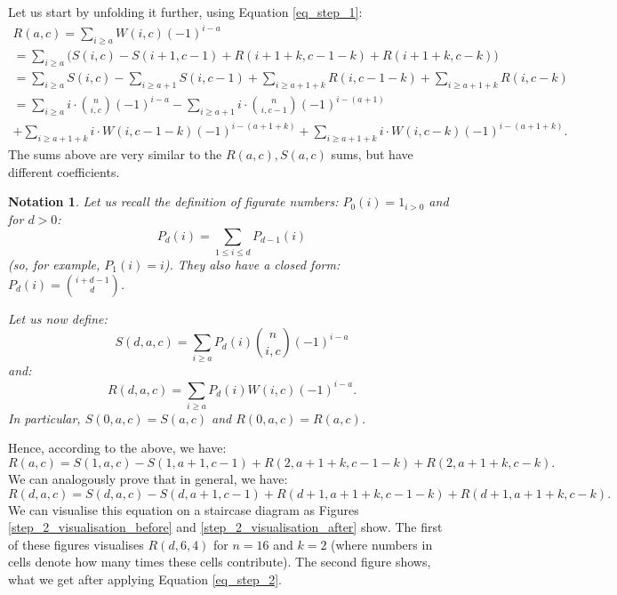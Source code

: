 \documentclass[11pt, reqno]{amsart}
\newtheorem*{notation}{Notation}
\numberwithin{equation}{section}
\begin{document}
Let us start by unfolding it further, using Equation \ref{eq_step_1}:
\begin{multline}
    R(a, c) = \sum_{i \geqslant a} W(i, c) (-1)^{i-a}\\ = \sum_{i \geqslant a} \Big( S(i, c) - S(i+1, c-1) + R(i+1+k, c-1-k) + R(i+1+k, c-k) \Big)\\
    = \sum_{i \geqslant a} S(i, c) - \sum_{i \geqslant a+1} S(i, c-1) + \sum_{i \geqslant a+1+k} R(i, c-1-k) + \sum_{i \geqslant a+1+k} R(i, c-k)\\
    = \sum_{i \geqslant a} i \cdot \binom{n}{i, c} (-1)^{i-a} - \sum_{i \geqslant a+1} i \cdot \binom{n}{i, c-1} (-1)^{i-(a+1)} \\+ \sum_{i \geqslant a+1+k} i \cdot W(i, c-1-k) (-1)^{i-(a+1+k)} + \sum_{i \geqslant a+1+k} i \cdot W(i, c-k) (-1)^{i-(a+1+k)}.
\end{multline}
The sums above are very similar to the $R(a, c), S(a, c)$ sums, but have different coefficients.
\begin{notation}
    Let us recall the definition of figurate numbers: $P_0(i)=1_{i>0}$ and for $d>0$:
    \begin{equation*}
        P_d(i)=\sum_{1 \leqslant i \leqslant d} P_{d-1}(i)
    \end{equation*}
    (so, for example, $P_1(i)=i$). They also have a closed form: $P_d(i)=\binom{i+d-1}{d}$.

    Let us now define:
    \begin{equation*}
        S(d, a, c)=\sum_{i \geqslant a} P_d(i) \binom{n}{i, c} (-1)^{i-a}
    \end{equation*}
    and:
    \begin{equation*}
        R(d, a, c) = \sum_{i \geqslant a} P_d(i) W(i, c) (-1)^{i-a}.
    \end{equation*}
    In particular, $S(0, a, c)=S(a, c)$ and $R(0, a, c)=R(a, c)$.
\end{notation}
Hence, according to the above, we have:
\begin{equation}
    R(a, c)=S(1, a, c) - S(1, a+1, c-1) + R(2, a+1+k, c-1-k)+ R(2, a+1+k, c-k).
\end{equation}
We can analogously prove that in general, we have:
\begin{equation}
\label{eq_step_2}
    R(d, a, c)=S(d, a, c) - S(d, a+1, c-1) + R(d+1, a+1+k, c-1-k)+ R(d+1, a+1+k, c-k).
\end{equation}
We can visualise this equation on a staircase diagram as Figures \ref{step_2_visualisation_before} and \ref{step_2_visualisation_after} show. The first of these figures visualises $R(d, 6, 4)$ for $n=16$ and $k=2$ (where numbers in cells denote how many times these cells contribute). The second figure shows, what we get after applying Equation \ref{eq_step_2}.
\end{document}
